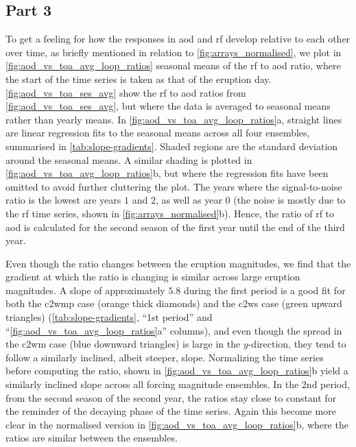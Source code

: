 \documentclass{ametsocV6.1}
\begin{document}
\subsection{Part 3}

To get a feeling for how the responses in \gls{aod} and \gls{rf} develop relative to
each other over time, as briefly mentioned in relation to \ref{fig:arrays_normalised},
we plot in \ref{fig:aod_vs_toa_avg_loop_ratios} seasonal means of the \gls{rf} to
\gls{aod} ratio, where the start of the time series is taken as that of the eruption
day. \ref{fig:aod_vs_toa_ses_avg} show the \gls{rf} to \gls{aod} ratios from
\ref{fig:aod_vs_toa_ses_avg}, but where the data is averaged to seasonal means rather
than yearly means. In \ref{fig:aod_vs_toa_avg_loop_ratios}a, straight lines are linear
regression fits to the seasonal means across all four ensembles, summarised in
\ref{tab:slope-gradients}. Shaded regions are the standard deviation around the seasonal
means. A similar shading is plotted in \ref{fig:aod_vs_toa_avg_loop_ratios}b, but where
the regression fits have been omitted to avoid further cluttering the plot. The years
where the signal-to-noise ratio is the lowest are years \(1\) and \(2\), as well as year
\(0\) (the noise is mostly due to the \gls{rf} time series, shown in
\ref{fig:arrays_normalised}b). Hence, the ratio of \gls{rf} to \gls{aod} is calculated
for the second season of the first year until the end of the third year.

Even though the ratio changes between the eruption magnitudes, we find that the gradient
at which the ratio is changing is similar across large eruption magnitudes. A slope of
approximately \(5.8\) during the first period is a good fit for both the \gls{c2wmp}
case (orange thick diamonds) and the \gls{c2ws} case (green upward triangles)
(\ref{tab:slope-gradients}, ``1st period'' and ``\ref{fig:aod_vs_toa_avg_loop_ratios}a''
columns), and even though the spread in the \gls{c2wm} case (blue downward triangles) is
large in the \(y\)-direction, they tend to follow a similarly inclined, albeit steeper,
slope. Normalizing the time series before computing the ratio, shown in
\ref{fig:aod_vs_toa_avg_loop_ratios}b yield a similarly inclined slope across all
forcing magnitude ensembles. In the 2nd period, from the second season of the second
year, the ratios stay close to constant for the reminder of the decaying phase of the
time series. Again this become more clear in the normalised version in
\ref{fig:aod_vs_toa_avg_loop_ratios}b, where the ratios are similar between the
ensembles.
\end{document}

